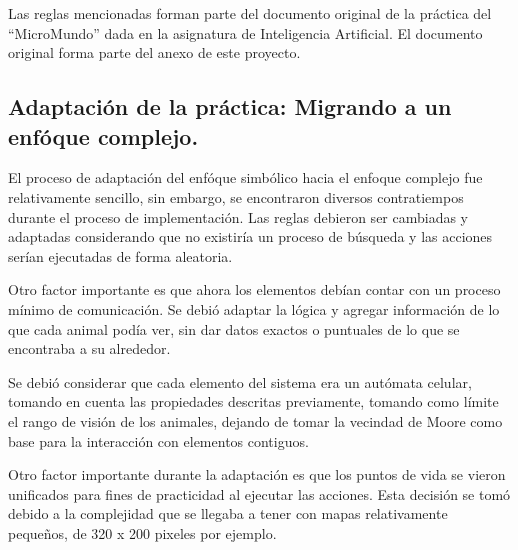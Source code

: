   Las reglas mencionadas forman parte del documento original de la práctica del ``MicroMundo'' dada en la asignatura de Inteligencia Artificial. El documento original forma parte del anexo de este proyecto.\cite{9}

\subsection{Adaptación de la práctica: Migrando a un enfóque complejo.}
  El proceso de adaptación del enfóque simbólico hacia el enfoque complejo fue relativamente sencillo, sin embargo, se encontraron diversos contratiempos durante el proceso de implementación. Las reglas debieron ser cambiadas y adaptadas considerando que no existiría un proceso de búsqueda y las acciones serían ejecutadas de forma aleatoria.

  Otro factor importante es que ahora los elementos debían contar con un proceso mínimo de comunicación. Se debió adaptar la lógica y agregar información de lo que cada animal podía ver, sin dar datos exactos o puntuales de lo que se encontraba a su alrededor.

  Se debió considerar que cada elemento del sistema era un autómata celular, tomando en cuenta las propiedades descritas previamente, tomando como límite el rango de visión de los animales, dejando de tomar la vecindad de Moore como base para la interacción con elementos contiguos.

  Otro factor importante durante la adaptación es que los puntos de vida se vieron unificados para fines de practicidad al ejecutar las acciones. Esta decisión se tomó debido a la complejidad que se llegaba a tener con mapas relativamente pequeños, de 320 x 200 pixeles por ejemplo.

